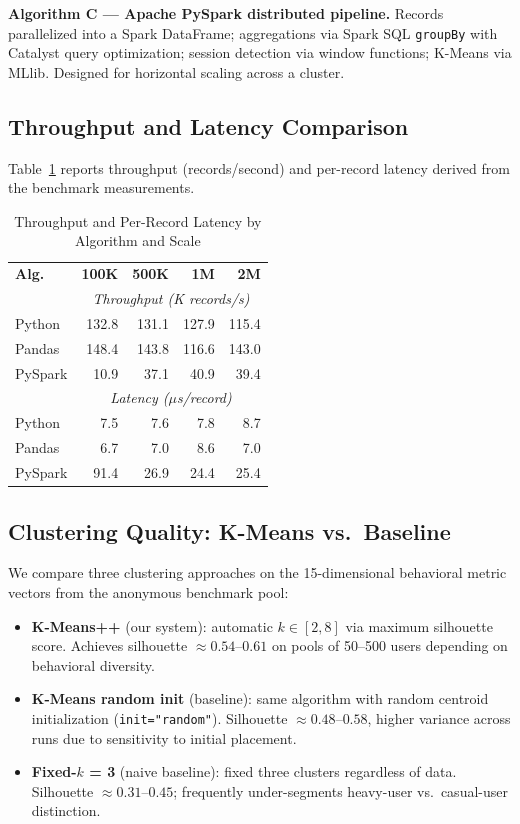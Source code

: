 \documentclass[conference]{IEEEtran}
\begin{document}
\textbf{Algorithm C — Apache PySpark distributed pipeline.}
Records parallelized into a Spark DataFrame; aggregations via Spark SQL
\texttt{groupBy} with Catalyst query optimization; session detection via
window functions; K-Means via MLlib. Designed for horizontal scaling
across a cluster.

\subsection{Throughput and Latency Comparison}

Table~\ref{tab:perf} reports throughput (records/second) and per-record
latency derived from the benchmark measurements.

\begin{table}[ht]
\caption{Throughput and Per-Record Latency by Algorithm and Scale}
\label{tab:perf}
\centering
\renewcommand{\arraystretch}{1.1}
\begin{tabular}{lrrrr}
\toprule
\textbf{Alg.} & \textbf{100K} & \textbf{500K} & \textbf{1M} & \textbf{2M} \\
              & \multicolumn{4}{c}{\textit{Throughput (K records/s)}} \\
\midrule
Python  & 132.8 & 131.1 & 127.9 & 115.4 \\
Pandas  & 148.4 & 143.8 & 116.6 & 143.0 \\
PySpark & 10.9  & 37.1  & 40.9  & 39.4  \\
\midrule
              & \multicolumn{4}{c}{\textit{Latency ($\mu$s/record)}} \\
\midrule
Python  & 7.5   & 7.6   & 7.8   & 8.7   \\
Pandas  & 6.7   & 7.0   & 8.6   & 7.0   \\
PySpark & 91.4  & 26.9  & 24.4  & 25.4  \\
\bottomrule
\end{tabular}
\end{table}

\subsection{Clustering Quality: K-Means vs.\ Baseline}

We compare three clustering approaches on the 15-dimensional behavioral
metric vectors from the anonymous benchmark pool:

\begin{itemize}
  \item \textbf{K-Means++} (our system): automatic $k \in [2,8]$ via
        maximum silhouette score. Achieves silhouette $\approx 0.54$–$0.61$
        on pools of 50–500 users depending on behavioral diversity.
  \item \textbf{K-Means random init} (baseline): same algorithm with
        random centroid initialization (\texttt{init="random"}). Silhouette
        $\approx 0.48$–$0.58$, higher variance across runs due to
        sensitivity to initial placement.
  \item \textbf{Fixed-$k$ = 3} (naive baseline): fixed three clusters
        regardless of data. Silhouette $\approx 0.31$–$0.45$; frequently
        under-segments heavy-user vs.\ casual-user distinction.
\end{itemize}
\end{document}
